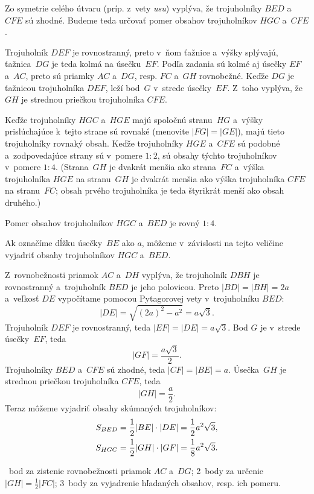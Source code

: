 {%
Zo symetrie celého útvaru (príp. z~vety {\it usu}) vyplýva,
že trojuholníky $BED$ a~$CFE$ sú zhodné.
Budeme teda určovať pomer obsahov trojuholníkov $HGC$ a~$CFE$.

Trojuholník $DEF$ je rovnostranný, preto v~ňom ťažnice a~výšky splývajú,
ťažnica~$DG$ je teda kolmá na úsečku~$EF$. Podľa zadania sú kolmé aj
úsečky $EF$ a~$AC$, preto sú priamky $AC$ a~$DG$, resp. $FC$ a~$GH$
rovnobežné.
Keďže $DG$ je ťažnicou trojuholníka $DEF$, leží bod~$G$ v~strede úsečky~$EF$.
Z~toho vyplýva, že $GH$ je strednou priečkou trojuholníka $CFE$.
%

Keďže trojuholníky $HGC$ a~$HGE$ majú spoločnú stranu~$HG$ a~výšky
prislúchajúce k~tejto strane sú rovnaké (menovite $|FG|=|GE|$),
majú tieto trojuholníky rovnaký obsah.
Keďže trojuholníky $HGE$ a~$CFE$ sú podobné a~zodpovedajúce strany
sú v~pomere $1:2$, sú obsahy týchto trojuholníkov v~pomere $1:4$.
(Strana~$GH$ je dvakrát menšia ako strana~$FC$ a~výška trojuholníka
$HGE$ na stranu~$GH$ je dvakrát menšia ako výška trojuholníka $CFE$ na stranu~$FC$;
obsah prvého trojuholníka je teda štyrikrát menší ako obsah druhého.)

Pomer obsahov trojuholníkov $HGC$ a~$BED$ je rovný $1:4$.

\poznamka
Ak označíme dĺžku úsečky~$BE$ ako $a$, môžeme v~závislosti na tejto veličine
vyjadriť obsahy trojuholníkov $HGC$ a~$BED$.

Z~rovnobežnosti priamok $AC$ a~$DH$ vyplýva, že trojuholník $DBH$
je rovnostranný a~trojuholník $BED$ je jeho polovicou.
Preto $|BD|=|BH|=2a$ a~veľkosť $DE$ vypočítame pomocou
Pytagorovej vety v~trojuholníku $BED$:
$$|DE|=\sqrt{(2a)^2-a^2}=a\sqrt3.
$$
Trojuholník $DEF$ je rovnostranný, teda $|EF|=|DE|=a\sqrt3$.
Bod $G$ je v~strede úsečky~$EF$, teda
$$|GF|=\frac{a\sqrt3}2.
$$
Trojuholníky $BED$ a~$CFE$ sú zhodné, teda $|CF|=|BE|=a$.
Úsečka~$GH$ je strednou priečkou trojuholníka $CFE$, teda
$$|GH|=\frac{a}2.
$$
Teraz môžeme vyjadriť obsahy skúmaných trojuholníkov:
$$
\aligned
S_{BED}&=\frac12|BE|\cdot|DE| =\frac12a^2\sqrt3,\\
S_{HGC}&=\frac12|GH|\cdot|GF| =\frac18 a^2\sqrt3.
\endaligned
$$

~bod za zistenie rovnobežnosti priamok $AC$ a~$DG$;
2~body za určenie $|GH|=\frac12|FC|$;
3~body za vyjadrenie hľadaných obsahov, resp. ich pomeru.
\endhodnotenie
}

